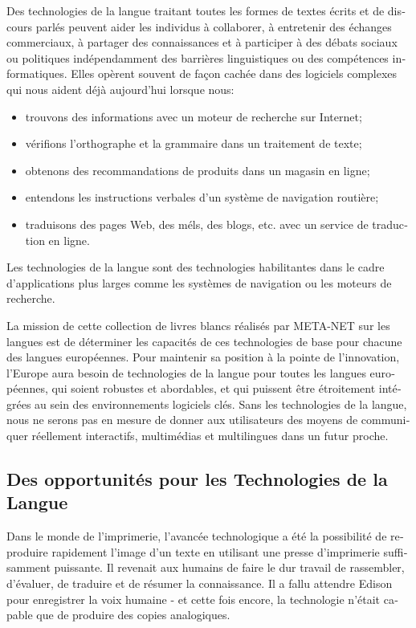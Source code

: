 \begin{french}
\begin{multicols}{2}
Des technologies de la langue traitant toutes les formes de textes
écrits et de discours parlés peuvent aider les individus à collaborer,
à entretenir des échanges commerciaux, à partager des connaissances et
à participer à des débats sociaux ou politiques indépendamment des
barrières linguistiques ou des compétences informatiques. Elles
opèrent souvent de façon cachée dans des logiciels complexes qui nous
aident déjà aujourd'hui lorsque nous:
\begin{itemize}
\item trouvons des informations avec un moteur de recherche sur
  Internet;
\item vérifions l'orthographe et la grammaire dans un
  traitement de texte;
\item obtenons des recommandations de produits dans un magasin en
  ligne;
\item entendons les instructions verbales d'un système de
  navigation routière;
\item traduisons des pages Web, des méls, des blogs, etc. avec un service de traduction en ligne.
\end{itemize}
Les technologies de la langue sont des technologies habilitantes dans
le cadre d'applications plus larges comme les systèmes de
navigation ou les moteurs de recherche. 

La mission de cette collection
de livres blancs réalisés par META-NET sur les langues est de
déterminer les capacités de ces technologies de base pour chacune des
langues européennes.
Pour maintenir sa position à la pointe de l'innovation,
l'Europe aura besoin de technologies de la langue pour toutes
les langues européennes, qui soient robustes et abordables, et qui
puissent être étroitement intégrées au sein des environnements
logiciels clés. Sans les technologies de la langue, nous ne serons pas
en mesure de donner aux utilisateurs des moyens de communiquer
réellement interactifs, multimédias et multilingues dans un futur
proche.

\subsection{Des opportunités pour les Technologies de la Langue}

Dans le monde de l'imprimerie, l'avancée technologique
a été la possibilité de reproduire rapidement l'image d'un texte en utilisant une presse d'imprimerie suffisamment
puissante. Il revenait aux humains de faire le dur travail de
rassembler, d'évaluer, de traduire et de résumer la
connaissance. Il a fallu attendre Edison pour enregistrer la voix
humaine - et cette fois encore, la technologie n'était capable
que de produire des copies analogiques.


\end{multicols}
\end{french}
